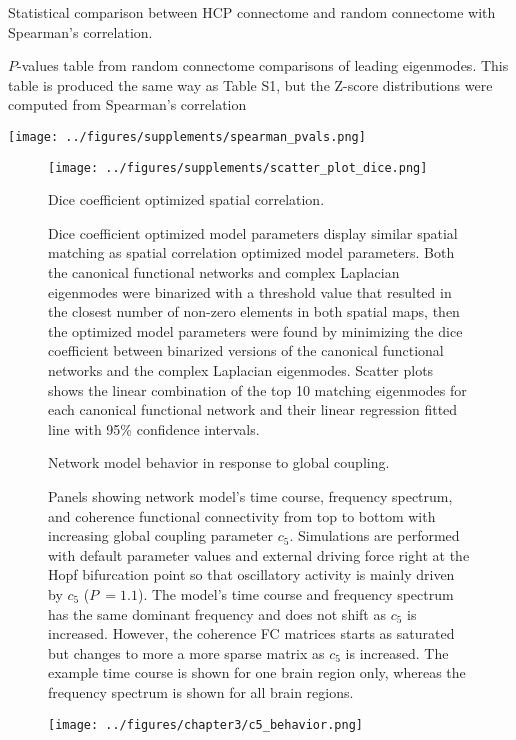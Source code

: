 \begin{table}[ht!]
\centering
\caption{Statistical comparison between HCP connectome and random connectome with Spearman's correlation.}
\caption*{$P$-values table from random connectome comparisons of leading eigenmodes. This table is produced the same way as Table S1, but the Z-score distributions were computed from Spearman's correlation}
\texttt{[image: ../figures/supplements/spearman\_pvals.png]}
\label{tab:S2}
\end{table}

\begin{figure}[ht!]
\centering
\texttt{[image: ../figures/supplements/scatter\_plot\_dice.png]}
\caption{Dice coefficient optimized spatial correlation.}
\caption*{Dice coefficient optimized model parameters display similar spatial matching as spatial correlation optimized model parameters. Both the canonical functional networks and complex Laplacian eigenmodes were binarized with a threshold value that resulted in the closest number of non-zero elements in both spatial maps, then the optimized model parameters were found by minimizing the dice coefficient between binarized versions of the canonical functional networks and the complex Laplacian eigenmodes. Scatter plots shows the linear combination of the top 10 matching eigenmodes for each canonical functional network and their linear regression fitted line with 95\% confidence intervals.}
\label{fig:S3}
\end{figure}

\begin{figure}[htbp]
    \centering
    \caption{Network model behavior in response to global coupling.}
    \caption*{Panels showing network model's time course, frequency spectrum, and coherence functional connectivity from top to bottom with increasing global coupling parameter $c_5$. Simulations are performed with default parameter values and external driving force right at the Hopf bifurcation point so that oscillatory activity is mainly driven by $c_5$ ($P ~= 1.1$). The model's time course and frequency spectrum has the same dominant frequency and does not shift as $c_5$ is increased. However, the coherence FC matrices starts as saturated but changes to more a more sparse matrix as $c_5$ is increased. The example time course is shown for one brain region only, whereas the frequency spectrum is shown for all brain regions.}
    \label{fig:c5_behavior}
\end{figure}
\clearpage
\begin{figure}
	\centering
	\captionsetup{labelformat=adja-page}
	\ContinuedFloat
	\texttt{[image: ../figures/chapter3/c5\_behavior.png]}
	\caption{}
\end{figure}


